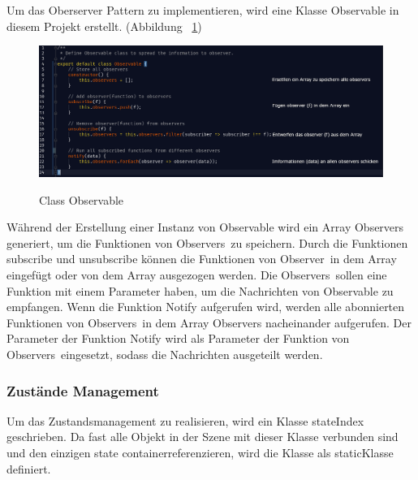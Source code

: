   Um das Oberserver Pattern zu implementieren, wird eine Klasse {\selectfont Observable} in diesem Projekt erstellt. (Abbildung ~\ref{fig:observable})
  
\begin{figure}[ht]
\vspace*{1em}
\centering
\caption[Class Observable]{Class Observable}
\includegraphics[width=\textwidth]{images/observable.png}
\label{fig:observable} 
\end{figure}
  Während der Erstellung einer Instanz von {\selectfont Observable} wird ein Array {\selectfont Observers} generiert, um die Funktionen von \glqq Observers\grqq\ zu speichern. Durch die Funktionen {\selectfont subscribe} und {\selectfont unsubscribe} können die Funktionen von \glqq Observer\grqq\ in dem Array eingefügt oder von dem Array ausgezogen werden. Die \glqq Observers\grqq\ sollen eine Funktion mit einem Parameter haben, um die Nachrichten von {\selectfont Observable} zu empfangen. Wenn die Funktion {\selectfont Notify} aufgerufen wird, werden alle abonnierten Funktionen von \glqq Observers\grqq\ in dem Array {\selectfont Observers} nacheinander aufgerufen. Der Parameter der Funktion {\selectfont Notify} wird als Parameter der Funktion von \glqq Observers\grqq\ eingesetzt, sodass die Nachrichten ausgeteilt werden.
  
  \subsubsection{Zustände Management}
  
  Um das Zustandsmanagement zu realisieren, wird ein Klasse {\selectfont stateIndex} geschrieben. Da fast alle Objekt in der Szene mit dieser Klasse verbunden sind und den einzigen \glqq state container\grqq referenzieren, wird die Klasse als \glqq static\grqq Klasse definiert.
  
